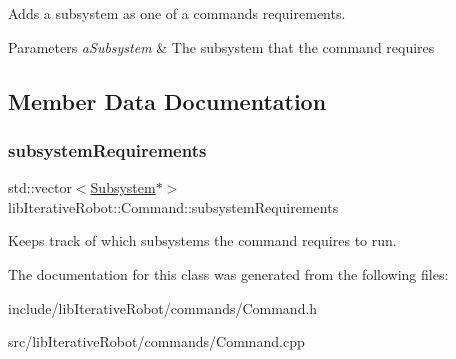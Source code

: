 Adds a subsystem as one of a command\textquotesingle{}s requirements. 


\begin{DoxyParams}{Parameters}
{\em a\+Subsystem} & The subsystem that the command requires \\
\hline
\end{DoxyParams}


\subsection{Member Data Documentation}
\mbox{\label{classlib_iterative_robot_1_1_command_abbedf025246921d5cde67aa954b74d35}} 
\subsubsection{\texorpdfstring{subsystemRequirements}{subsystemRequirements}}
{\footnotesize\ttfamily std\+::vector$<$\mbox{\hyperlink{classlib_iterative_robot_1_1_subsystem}{Subsystem}}$\ast$$>$ lib\+Iterative\+Robot\+::\+Command\+::subsystem\+Requirements\hspace{0.3cm}{\ttfamily [private]}}



Keeps track of which subsystems the command requires to run. 

 

The documentation for this class was generated from the following files\+:\begin{DoxyCompactItemize}
\item 
include/lib\+Iterative\+Robot/commands/Command.\+h\item 
src/lib\+Iterative\+Robot/commands/Command.\+cpp\end{DoxyCompactItemize}

